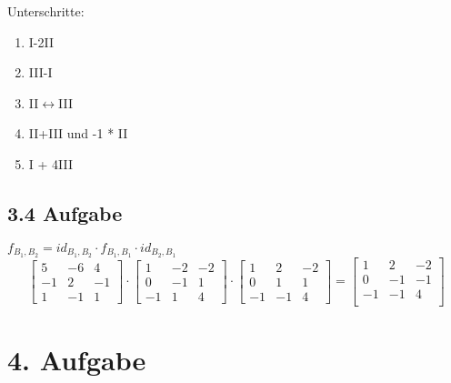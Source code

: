 \documentclass{report}
\begin{document}
Unterschritte:
\begin{enumerate}
    \item I-2II
    \item III-I
    \item II$\leftrightarrow$III
    \item II+III und -1 * II
    \item I + 4III
\end{enumerate}

\subsection*{3.4 Aufgabe}

$f_{B_1,B_2} = id_{B_1,B_2} \cdot f_{B_1,B_1} \cdot id_{B_2,B_1}$
\[
    \begin{bmatrix}
        5 & -6 & 4 \\
        -1 & 2 & -1 \\
        1 & -1 & 1
    \end{bmatrix} \cdot
    \begin{bmatrix}
        1 & -2 & -2 \\
        0 & -1 & 1 \\
        -1 & 1 & 4
    \end{bmatrix} \cdot 
    \begin{bmatrix}
        1 & 2 & -2 \\
        0 & 1 & 1 \\
        -1 & -1 & 4
    \end{bmatrix} =
    \begin{bmatrix}
        1 & 2 & -2 \\
        0 & -1 & -1 \\
        -1 & -1 & 4 \\
    \end{bmatrix}
\]

\section*{4. Aufgabe}
\end{document}
